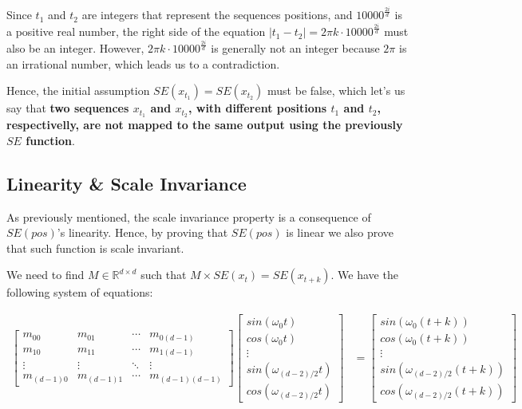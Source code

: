 \documentclass{article}
\begin{document}
Since \( t_1 \) and \( t_2 \) are integers that represent the sequences positions, and \( 10000^{\frac{2i}{d}} \) is a positive real number, the right side of the equation \( \left| t_1 - t_2 \right| = 2\pi k \cdot 10000^{\frac{2i}{d}} \) must also be an integer. However, \( 2\pi k \cdot 10000^{\frac{2i}{d}} \) is generally not an integer because \( 2\pi \) is an irrational number, which leads us to a contradiction.

Hence, the initial assumption $SE(x_{t_1}) = SE(x_{t_2})$ must be false, which let's us say that \textbf{ two sequences $x_{t_1}$ and $x_{t_2}$, with different positions $t_1$ and $t_2$, respectivelly, are not mapped to the same output using the previously  $SE$ function}.


\subsection{Linearity \& Scale Invariance}

As previously mentioned, the scale invariance property is a consequence of $SE(pos)$'s linearity. Hence, by proving that $SE(pos)$ is linear we also prove that such function is scale invariant. 

We need to find $M \in \mathbb{R}^{d \times d}$ such that $M \times  SE(x_{t}) = SE(x_{t + k}) $. We have the following system of equations:

\begin{align}
	\begin{bmatrix}
		m_{00} & m_{01} & \cdots & m_{0(d-1)} \\
		m_{10} & m_{11} & \cdots & m_{1(d-1)} \\
		\vdots & \vdots & \ddots & \vdots \\
		m_{(d-1) 0} & m_{(d-1)1} & \cdots & m_{(d-1)(d-1)}
	\end{bmatrix}
	\begin{bmatrix}
		sin(\omega_0 t) \\
		cos(\omega_0 t) \\
		\vdots \\
		sin(\omega_{(d-2)/2} t) \\
		cos(\omega_{(d-2)/2} t) 
	\end{bmatrix}
	&=\begin{bmatrix}
		sin(\omega_0 (t+k)) \\
		cos(\omega_0 (t+k)) \\
		\vdots \\
		sin(\omega_{(d-2)/2}  (t+k)) \\
		cos(\omega_{(d-2)/2} (t+k)) 
	\end{bmatrix}
\end{align}
\end{document}
